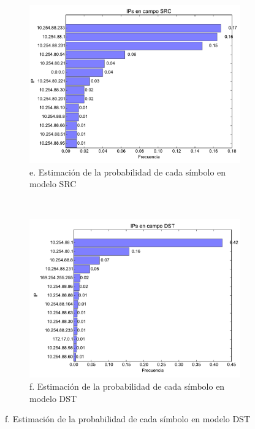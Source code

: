 \begin{figure}[H]
	\center
	\begin{subfigure}{0.43\textwidth}
		\includegraphics[width=1.0\textwidth]{resultados/starbucks/ipsSrc_4_6187931499.pdf}
		\caption{e. Estimaci\'on de la probabilidad de cada s\'imbolo en modelo SRC}
	\end{subfigure}
	~
	\begin{subfigure}{0.43\textwidth}
		\includegraphics[width=1.0\textwidth]{resultados/starbucks/ipsDst_3_76848714287.pdf}
		\caption{f. Estimaci\'on de la probabilidad de cada s\'imbolo en modelo DST}
	\end{subfigure}
\end{figure}


